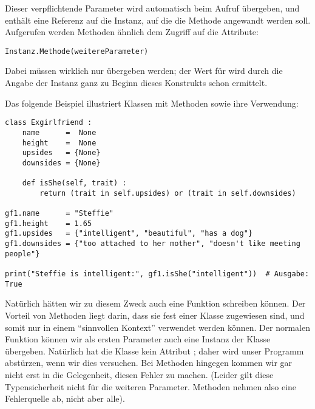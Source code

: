 Dieser verpflichtende Parameter  wird automatisch beim Aufruf übergeben, und enthält eine Referenz auf die Instanz, auf die die Methode angewandt werden soll. Aufgerufen werden Methoden ähnlich dem Zugriff auf die Attribute:
\begin{codebox}
\begin{verbatim}
Instanz.Methode(weitereParameter)
\end{verbatim}
\end{codebox}

Dabei müssen wirklich nur  übergeben werden; der Wert für  wird durch die Angabe der Instanz ganz zu Beginn dieses Konstrukts schon ermittelt.

Das folgende Beispiel illustriert Klassen mit Methoden sowie ihre Verwendung:
\begin{codebox}
\begin{verbatim}
class Exgirlfriend :
    name      =  None
    height    =  None
    upsides   = {None}
    downsides = {None}
    
    def isShe(self, trait) :
        return (trait in self.upsides) or (trait in self.downsides)

gf1.name      = "Steffie"
gf1.height    = 1.65
gf1.upsides   = {"intelligent", "beautiful", "has a dog"}
gf1.downsides = {"too attached to her mother", "doesn't like meeting people"}

print("Steffie is intelligent:", gf1.isShe("intelligent"))  # Ausgabe: True
\end{verbatim}
\end{codebox}

Natürlich hätten wir zu diesem Zweck auch eine Funktion  schreiben können. Der Vorteil von Methoden liegt darin, dass sie fest einer Klasse zugewiesen sind, und somit nur in einem \enquote{sinnvollen Kontext} verwendet werden können. Der normalen Funktion  können wir als ersten Parameter auch eine Instanz der Klasse  übergeben. Natürlich hat die Klasse  kein Attribut ; daher wird unser Programm abstürzen, wenn wir dies versuchen. Bei Methoden hingegen kommen wir gar nicht erst in die Gelegenheit, diesen Fehler zu machen. (Leider gilt diese Typensicherheit nicht für die weiteren Parameter. Methoden nehmen also eine Fehlerquelle ab, nicht aber alle).

